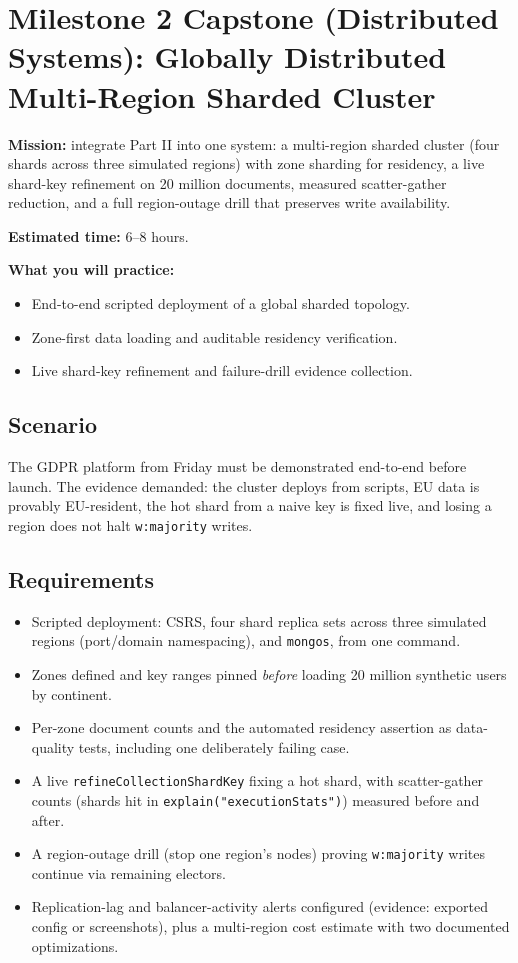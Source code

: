 \section{Milestone 2 Capstone (Distributed Systems): Globally Distributed Multi-Region Sharded Cluster}\label{sec:ch8-capstone}

\begin{capstonebox}
\textbf{Mission:} integrate Part II into one system: a multi-region sharded cluster (four shards across three simulated regions) with zone sharding for residency, a live shard-key refinement on 20 million documents, measured scatter-gather reduction, and a full region-outage drill that preserves write availability.

\textbf{Estimated time:} 6--8 hours.

\textbf{What you will practice:}
\begin{itemize}
    \item End-to-end scripted deployment of a global sharded topology.
    \item Zone-first data loading and auditable residency verification.
    \item Live shard-key refinement and failure-drill evidence collection.
\end{itemize}
\end{capstonebox}

\subsection*{Scenario}
The GDPR platform from Friday must be demonstrated end-to-end before launch. The evidence demanded: the cluster deploys from scripts, EU data is provably EU-resident, the hot shard from a naive key is fixed live, and losing a region does not halt \texttt{w:majority} writes.

\subsection*{Requirements}
\begin{itemize}
    \item Scripted deployment: CSRS, four shard replica sets across three simulated regions (port/domain namespacing), and \texttt{mongos}, from one command.
    \item Zones defined and key ranges pinned \emph{before} loading 20 million synthetic users by continent.
    \item Per-zone document counts and the automated residency assertion as data-quality tests, including one deliberately failing case.
    \item A live \texttt{refineCollectionShardKey} fixing a hot shard, with scatter-gather counts (shards hit in \texttt{explain("executionStats")}) measured before and after.
    \item A region-outage drill (stop one region's nodes) proving \texttt{w:majority} writes continue via remaining electors.
    \item Replication-lag and balancer-activity alerts configured (evidence: exported config or screenshots), plus a multi-region cost estimate with two documented optimizations.
\end{itemize}

